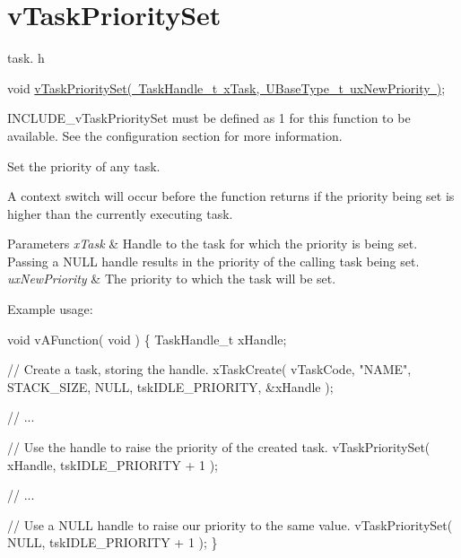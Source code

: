 \hypertarget{group__v_task_priority_set}{}\section{v\+Task\+Priority\+Set}
\label{group__v_task_priority_set}
task. h 
\begin{DoxyPre}void \mbox{\hyperlink{task_8h_a1ee31be76e326e0644dbd6ac40a787b6}{vTaskPrioritySet( TaskHandle\_t xTask, UBaseType\_t uxNewPriority )}};\end{DoxyPre}


I\+N\+C\+L\+U\+D\+E\+\_\+v\+Task\+Priority\+Set must be defined as 1 for this function to be available. See the configuration section for more information.

Set the priority of any task.

A context switch will occur before the function returns if the priority being set is higher than the currently executing task.


\begin{DoxyParams}{Parameters}
{\em x\+Task} & Handle to the task for which the priority is being set. Passing a N\+U\+LL handle results in the priority of the calling task being set.\\
\hline
{\em ux\+New\+Priority} & The priority to which the task will be set.\\
\hline
\end{DoxyParams}
Example usage\+: 
\begin{DoxyPre}
void vAFunction( void )
\{
TaskHandle\_t xHandle;\end{DoxyPre}



\begin{DoxyPre}    // Create a task, storing the handle.
    xTaskCreate( vTaskCode, "NAME", STACK\_SIZE, NULL, tskIDLE\_PRIORITY, \&xHandle );\end{DoxyPre}



\begin{DoxyPre}    // ...\end{DoxyPre}



\begin{DoxyPre}    // Use the handle to raise the priority of the created task.
    vTaskPrioritySet( xHandle, tskIDLE\_PRIORITY + 1 );\end{DoxyPre}



\begin{DoxyPre}    // ...\end{DoxyPre}



\begin{DoxyPre}    // Use a NULL handle to raise our priority to the same value.
    vTaskPrioritySet( NULL, tskIDLE\_PRIORITY + 1 );
\}
  \end{DoxyPre}
 